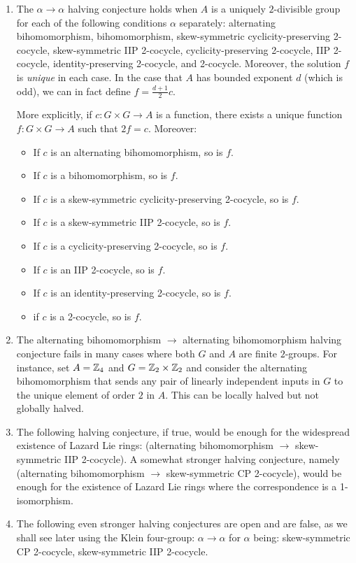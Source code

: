 \documentclass[10pt]{amsart}
\begin{document}
\begin{enumerate}
\item The $\alpha \to \alpha$ halving conjecture holds when $A$ is a
  uniquely $2$-divisible group for each of the following conditions
  $\alpha$ separately: alternating bihomomorphism, bihomomorphism,
  skew-symmetric cyclicity-preserving 2-cocycle, skew-symmetric IIP
  2-cocycle, cyclicity-preserving 2-cocycle, IIP 2-cocycle,
  identity-preserving 2-cocycle, and 2-cocycle. Moreover, the solution
  $f$ is {\em unique} in each case. In the case that $A$ has bounded
  exponent $d$ (which is odd), we can in fact define $f = \frac{d +
  1}{2}c$.

  More explicitly, if $c:G \times G \to A$ is a function, there
  exists a unique function $f: G \times G \to A$ such that $2f = c$. Moreover:
  \begin{itemize}
  \item If $c$ is an alternating bihomomorphism, so is $f$.
  \item If $c$ is a bihomomorphism, so is $f$.
  \item If $c$ is a skew-symmetric cyclicity-preserving 2-cocycle, so is $f$.
  \item If $c$ is a skew-symmetric IIP 2-cocycle, so is $f$.
  \item If $c$ is a cyclicity-preserving 2-cocycle, so is $f$.
  \item If $c$ is an IIP 2-cocycle, so is $f$.
  \item If $c$ is an identity-preserving 2-cocycle, so is $f$.
  \item if $c$ is a 2-cocycle, so is $f$.
  \end{itemize}
\item The alternating bihomomorphism $\to$ alternating bihomomorphism
  halving conjecture fails in many cases where both $G$ and $A$ are
  finite $2$-groups. For instance, set $A = \mathbb{Z}_4$ and $G = \mathbb{Z}_2 \times
  \mathbb{Z}_2$ and consider the alternating bihomomorphism that sends any
  pair of linearly independent inputs in $G$ to the unique element of
  order $2$ in $A$. This can be locally halved but not globally
  halved.
\item The following halving conjecture, if true, would be enough for
  the widespread existence of Lazard Lie rings: (alternating
  bihomomorphism $\to$ skew-symmetric IIP 2-cocycle). A somewhat
  stronger halving conjecture, namely (alternating bihomomorphism
  $\to$ skew-symmetric CP 2-cocycle), would be enough for the
  existence of Lazard Lie rings where the correspondence is a
  1-isomorphism.
\item The following even stronger halving conjectures are open and are
  false, as we shall see later using the Klein four-group: $\alpha \to
  \alpha$ for $\alpha$ being: skew-symmetric CP 2-cocycle,
  skew-symmetric IIP 2-cocycle.
\end{enumerate}
\end{document}
